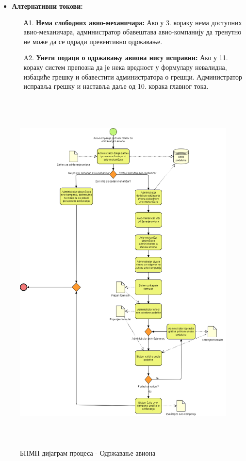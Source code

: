 \documentclass{article}
\begin{document}
\begin{itemize}
    \item \textbf{Алтернативни токови:}
        \begin{itemize}
            \item[А1.] \textbf{Нема слободних авио-механичара:} Ако у 3. кораку нема доступних авио-механичара, администратор обавештава авио-компанију да тренутно не може да се одради превентивно одржавање.
            \item [A2.] \textbf{Унети подаци о одржавању авиона нису исправни:} Ако у 11. кораку систем препозна да је нека вредност у формулару невалидна, избациће грешку и обавестити администратора о грешци. Администратор исправља грешку и наставља даље од 10. корака главног тока.
        \end{itemize}
\end{itemize}

\begin{figure}[H]
    \begin{center}
        \includegraphics[width=1.1\textwidth, height=19cm]{Dijagrami_slike/odrzavanje_aviona.png}
        \caption{БПМН дијаграм процеса - Одржавање авиона}
    \end{center}
\end{figure}
\end{document}
